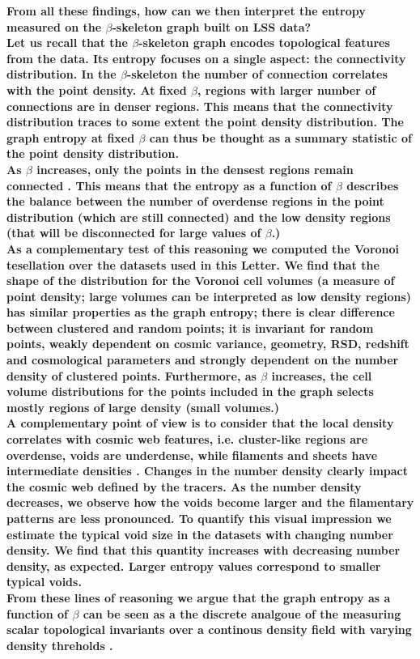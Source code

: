 \documentclass[fleqn,usenatbib]{mnras}
\begin{document}
\textbf{From all these findings, how can we then interpret the entropy measured on the
  $\beta$-skeleton graph built on LSS data?\\
\indent
Let us recall that the $\beta$-skeleton graph encodes topological
features from the data.
  Its entropy focuses on a single aspect: the connectivity distribution.
  In the $\beta$-skeleton the number of connection correlates with the
  point density.
  At fixed $\beta$, regions with larger number of connections are in 
  denser regions.
  This means that the connectivity distribution traces to some extent
  the point density distribution.
  The graph entropy at fixed $\beta$ can thus be thought as a summary
  statistic of the point density distribution.\\
\indent
  As $\beta$ increases, only the points in the densest regions remain
  connected \citep{2019MNRAS.485.5276F}.
  This means that the entropy as a function of $\beta$ describes the
  balance between the number of 
  overdense regions in the point distribution (which are still
  connected) and the low density regions (that will be disconnected
  for large values of $\beta$.)\\
\indent
As a complementary test of this reasoning we computed the Voronoi
tesellation over the datasets used in this Letter. 
We find that the shape of the distribution for the Voronoi cell volumes (a measure
of point density; large volumes can be interpreted as low density regions) 
has similar properties as the graph entropy; there is clear difference between clustered and random points; it is invariant for random points,
weakly dependent on cosmic variance, geometry, RSD, redshift and
cosmological parameters and strongly dependent on the number density
of clustered points.
Furthermore, as $\beta$ increases, the cell volume distributions for the points included in
the graph selects mostly regions of large density (small volumes.)\\
\indent
A complementary point of view is to consider that the local density
correlates with cosmic web features,
i.e. cluster-like regions are overdense, voids are underdense, while filaments and sheets have
 intermediate densities \citep{2018MNRAS.473.1195L}. 
 Changes in the number density clearly impact the cosmic web defined by the tracers.
  As the number density decreases, we observe how the voids become
  larger and the filamentary patterns are less pronounced.  
  To quantify this visual impression we estimate the typical void size
  in the datasets with changing number density.  
  We find that this quantity increases with decreasing number density, 
  as expected.
  Larger entropy values correspond to smaller typical voids.\\
\indent
From these lines of reasoning we argue that the graph entropy as a
  function of $\beta$ can be seen as a the discrete analgoue of
  the measuring scalar topological invariants 
  over a continous density field with varying density threholds \citep{2013JKAS...46..125P}.}
\end{document}
